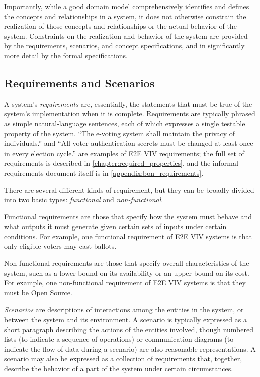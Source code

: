 Importantly, while a good domain model comprehensively identifies and
defines the concepts and relationships in a system, it does not
otherwise constrain the realization of those concepts and
relationships or the actual behavior of the system. Constraints on the
realization and behavior of the system are provided by the
requirements, scenarios, and concept specifications, and in
significantly more detail by the formal specifications.

\subsection{Requirements and Scenarios}

A system's \emph{requirements} are, essentially, the statements that
must be true of the system's implementation when it is
complete. Requirements are typically phrased as simple
natural-language sentences, each of which expresses a single testable
property of the system. ``The e-voting system shall maintain the
privacy of individuals.'' and ``All voter authentication secrets must
be changed at least once in every election cycle.'' are examples of
E2E VIV requirements; the full set of requirements is described in
\autoref{chapter:required_properties}, and the informal requirements
document itself is in \autoref{appendix:bon_requirements}.

There are several different kinds of requirement, but they can be
broadly divided into two basic types: \emph{functional} and
\emph{non-functional}.

Functional requirements are those that specify how the system must
behave and what outputs it must generate given certain sets of inputs
under certain conditions. For example, one functional requirement
of E2E VIV systems is that only eligible voters may cast ballots.

Non-functional requirements are those that specify overall
characteristics of the system, such as a lower bound on its
availability or an upper bound on its cost. For example, one
non-functional requirement of E2E VIV systems is that they must be
Open Source.

\emph{Scenarios} are descriptions of interactions among the entities
in the system, or between the system and its environment. A scenario
is typically expressed as a short paragraph describing the actions of
the entities involved, though numbered lists (to indicate a sequence
of operations) or communication diagrams (to indicate the flow of data
during a scenario) are also reasonable representations. A scenario may
also be expressed as a collection of requirements that, together,
describe the behavior of a part of the system under certain
circumstances.

